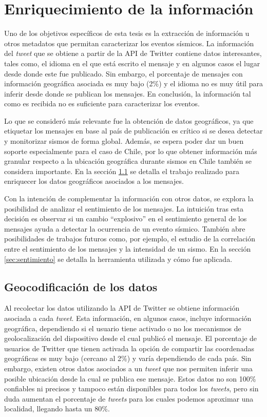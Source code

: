 \chapter{Enriquecimiento de la información}
\label{cap:procesamiento}

Uno de los objetivos específicos de esta tesis es la extracción de información u otros metadatos que permitan caracterizar los eventos sísmicos. 
%
La información del \textit{tweet} que se obtiene a partir de la API de Twitter contiene datos interesantes, tales como, el idioma en el que está escrito el mensaje y en algunos casos el lugar desde donde este fue publicado. Sin embargo, el porcentaje de mensajes con información geográfica asociada es muy bajo (2\%) y el idioma no es muy útil para inferir desde donde se publican los mensajes.
%
En conclusión, la información tal como es recibida no es suficiente para caracterizar los eventos. 

Lo que se consideró más relevante fue la obtención de datos geográficos, ya que etiquetar los mensajes en base al país de publicación es crítico si se desea detectar y monitorizar sismos de forma global.
Además, se espera poder dar un buen soporte especialmente para el caso de Chile, por lo que obtener información más granular respecto a la ubicación geográfica durante sismos en Chile también se considera importante. En la sección \ref{sec:geocodificacion} se detalla el trabajo realizado para enriquecer los datos geográficos asociados a los mensajes.

Con la intención de complementar la información con otros datos, se explora la posibilidad de analizar el sentimiento de los mensajes. La intuición tras esta decisión es observar si un cambio ``explosivo'' en el sentimiento general de los mensajes ayuda a detectar la ocurrencia de un evento sísmico. También abre posibilidades de trabajos futuros como, por ejemplo, el estudio de la correlación entre el sentimiento de los mensajes y la intensidad de un sismo. En la sección \ref{sec:sentimiento} se detalla la herramienta utilizada y cómo fue aplicada.

\section{Geocodificación de los datos}
\label{sec:geocodificacion}

Al recolectar los datos utilizando la API de Twitter se obtiene información asociada a cada \textit{tweet}. 
%
Esta información, en algunos casos, incluye información geográfica, dependiendo si el usuario tiene activado o no los mecanismos de geolocalización del dispositivo desde el cual publicó el mensaje.
%
El porcentaje de usuarios de Twitter que tienen activada la opción de compartir las coordenadas geográficas es muy bajo (cercano al 2\%) y varía dependiendo de cada país. 
%
Sin embargo, existen otros datos asociados a un \textit{tweet} que nos permiten inferir una posible ubicación desde la cual se publica ese mensaje. 
%
Estos datos no son 100\% confiables ni precisos y tampoco están disponibles para todos los \textit{tweets}, pero sin duda aumentan el porcentaje de \textit{tweets} para los cuales podemos aproximar una localidad, llegando hasta un 80\%.


